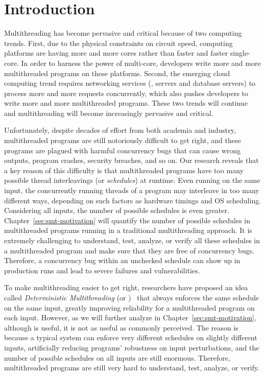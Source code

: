 \chapter{Introduction} \label{sec:intro}

Multithreading has become pervasive and critical because of two computing
trends. First, due to the physical constraints on circuit speed, computing
platforms are having more and more cores rather than faster and faster
single-core. In order to harness the power of multi-core, developers write more
and more multithreaded programs on these platforms. Second, the emerging cloud
computing trend requires networking services (\eg, \http servers and database
servers) to process more and more requests concurrently, which also pushes
developers to write more and more multithreaded programs. These two trends will
continue and multithreading will become increasingly pervasive and critical.

Unfortunately, despite decades of effort from both academia and industry,
multithreaded programs are still notoriously difficult to get right, and these
programs are plagued with harmful concurrency bugs that can cause wrong outputs,
program crashes, security breaches, and so on. Our research reveals that a key
reason of this difficulty is that multithreaded programs have too many
possible thread interleavings (or \emph{schedules}) at runtime. Even running on 
the same input, the concurrently running threads of a program may interleave in 
too many different ways, depending on such factors as hardware timings and OS
scheduling. Considering all inputs, the number of possible schedules is even
greater. Chapter~\ref{sec:smt-motivation} will quantify the number of
possible schedules in multithreaded programs running in a traditional
multithreading approach. It is extremely challenging to understand, test, 
analyze, or verify all these schedules in a multithreaded program and 
make sure that they are free of concurrency bugs. Therefore, a concurrency bug 
within an unchecked schedule can show up in production runs and lead to severe 
failures and vulnerabilities.

To make multithreading easier to get right, researchers have proposed an idea 
called \emph{Deterministic Multithreading} (or 
\emph{\dmt})~\cite{dthreads:sosp11, dpj:oopsla09, dmp:asplos09, kendo:asplos09, 
coredet:asplos10} that always enforces the same schedule on the same input, 
greatly improving reliability for a multithreaded program on each input. 
However, as we will further analyze in
Chapter~\ref{sec:smt-motivation}, although \dmt is useful, it is not as useful
as commonly perceived. The reason is because a typical \dmt system can enforce
very different schedules on slightly different inputs, artificially reducing
programs' robustness on input perturbations, and the number of possible
schedules on all inputs are still enormous. Therefore, multithreaded programs
are still very hard to understand, test, analyze, or verify.


